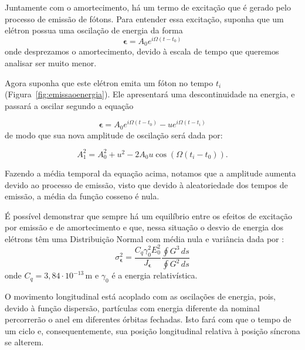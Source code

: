 Juntamente com o amortecimento, há um termo de excitação que é gerado pelo processo de emissão de fótons. Para entender essa excitação, suponha que um elétron possua uma oscilação de energia da forma
\begin{equation}
 \boldsymbol{\epsilon}=A_0 e^{i \Omega(t-t_0)}
\end{equation}
onde desprezamos o amortecimento, devido à escala de tempo que queremos analisar ser muito menor.


Agora suponha que este elétron emita um fóton no tempo $t_i$ \mbox{(Figura \ref{fig:emissaoenergia})}. Ele apresentará uma descontinuidade na energia, e passará a oscilar segundo a equação

\begin{equation}
 \boldsymbol{\epsilon}=A_0 e^{i \Omega(t-t_0)}-u e^{i \Omega(t-t_i)}
\end{equation}
de modo que sua nova amplitude de oscilação será dada por:

\begin{equation}
 A_1^2 = A_0^2 + u^2 - 2 A_0 u \cos(\Omega(t_i-t_0)).
\end{equation}

Fazendo a média temporal da equação acima, notamos que a amplitude aumenta devido ao processo de emissão, visto que devido à aleatoriedade dos tempos de emissão, a média da função cosseno é nula.

É possível demonstrar que sempre há um equilíbrio entre os efeitos de excitação por emissão e de amortecimento e que, nessa situação o desvio de energia dos elétrons têm uma Distribuição Normal com média nula e variância dada por \cite{Wiedemann3}:
\begin{equation}
 \sigma^2_{\boldsymbol{\epsilon}} = \frac{C_q \gamma^2_0
E_0^2}{J_{\boldsymbol{\epsilon}}} \frac{\oint G^3\, ds}{\oint G^2\, ds}
\end{equation}
onde $C_q = \mathrm{3,84\cdot 10^{-13}\, m}$ e $\gamma_0$ é a energia relativística.

O movimento longitudinal está acoplado com as oscilações de energia, pois, devido à função dispersão, partículas com energia diferente da nominal percorrerão o anel em diferentes órbitas fechadas. Isto fará com que o tempo de um ciclo e, consequentemente, sua posição longitudinal relativa à posição síncrona se alterem.

